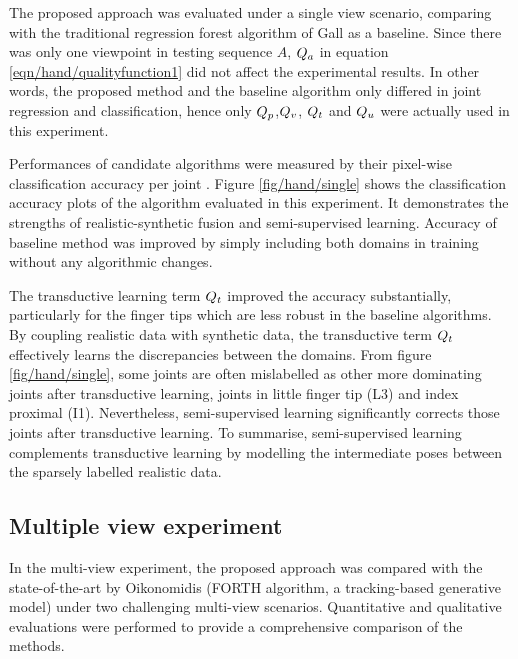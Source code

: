 The proposed approach was evaluated under a single view scenario, comparing with the traditional regression forest algorithm of Gall \etal \cite{Gall2011} as a baseline. Since there was only one viewpoint in testing sequence $A$, $Q_{a}$ in equation \ref{eqn/hand/qualityfunction1} did not affect the experimental results. In other words, the proposed method and the baseline algorithm only differed in joint regression and classification, hence only $Q_{p}$,$Q_{v}$, $Q_{t}$ and $Q_{u}$ were actually used in this experiment.    

Performances of candidate algorithms were measured by their pixel-wise classification accuracy per joint \cite{Shotton2011}. Figure \ref{fig/hand/single} shows the classification accuracy plots of the algorithm evaluated in this experiment.  
It demonstrates the strengths of realistic-synthetic fusion and semi-supervised learning. 
Accuracy of baseline method was improved by simply including both domains in training without any algorithmic changes. 

The transductive learning term $Q_{t}$ improved the accuracy substantially, particularly for the finger tips which are less robust in the baseline algorithms.  
By coupling realistic data with synthetic data, the transductive term $Q_{t}$ effectively learns the discrepancies between the domains.
From figure \ref{fig/hand/single}, some joints are often mislabelled as other more dominating joints after transductive learning, \eg joints in little finger tip (L3) and index proximal (I1). 
Nevertheless, semi-supervised learning significantly corrects those joints after transductive learning. To summarise, semi-supervised learning complements transductive learning by modelling the intermediate poses between the sparsely labelled realistic data.    


\subsection{Multiple view experiment}  

In the multi-view experiment, the proposed approach was compared with the state-of-the-art by Oikonomidis \etal (FORTH algorithm, a tracking-based generative model) \cite{Oikonomidis2011} under two challenging multi-view scenarios. Quantitative and qualitative evaluations were performed to provide a comprehensive comparison of the methods. 

